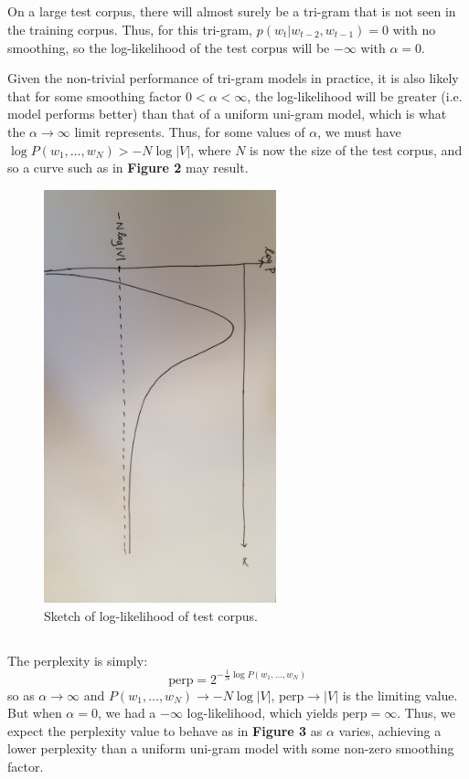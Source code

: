 \documentclass[psamsfonts]{amsart}
\theoremstyle{definition}
\theoremstyle{remark}
\numberwithin{equation}{section}
\begin{document}
\subsection{} On a large test corpus, there will almost surely be a tri-gram that is not seen in the training corpus. Thus, for this tri-gram, $p(w_t|w_{t-2},w_{t-1}) = 0$ with no smoothing, so the log-likelihood of the test corpus will be $-\infty$ with $\alpha = 0$.

Given the non-trivial performance of tri-gram models in practice, it is also likely that for some smoothing factor $0 <\alpha < \infty$, the log-likelihood will be greater (i.e. model performs better) than that of a uniform uni-gram model, which is what the $\alpha\rightarrow\infty$ limit represents. Thus, for some values of $\alpha$, we must have $\log P(w_1, \dots, w_N) > -N\log|V|$, where $N$ is now the size of the test corpus, and so a curve such as in {\bf Figure 2} may result.

\begin{figure}
	\includegraphics[width=0.6\textwidth]{1-2.jpg}
	\caption{Sketch of log-likelihood of test corpus.}
\end{figure}


\subsection{} The perplexity is simply:
$$\text{perp} = 2^{-\frac{1}{N} \log P(w_1, \dots, w_N)}$$
so as $\alpha \rightarrow\infty$ and $P(w_1, \dots, w_N) \rightarrow -N\log |V|$, $\text{perp} \rightarrow |V|$ is the limiting value. But when $\alpha = 0$, we had a $-\infty$ log-likelihood, which yields $\text{perp} = \infty$. Thus, we expect the perplexity value to behave as in {\bf Figure 3} as $\alpha$ varies, achieving a lower perplexity than a uniform uni-gram model with some non-zero smoothing factor.
\end{document}

